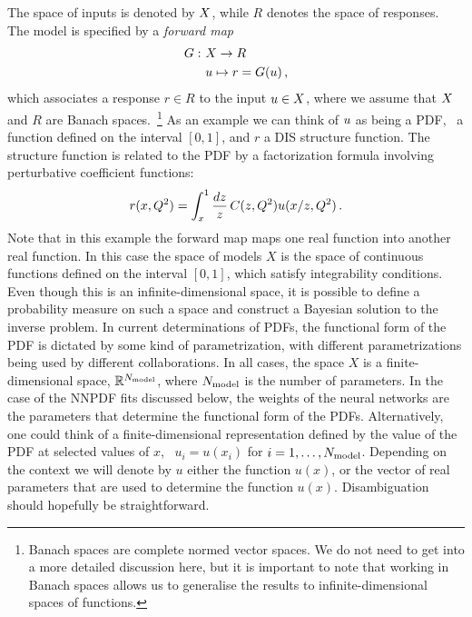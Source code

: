 The space of inputs is denoted by $X$, while $R$ denotes the space of
responses. The model is specified by a {\em forward map}
\begin{align}
  \label{eq:ForwardMap}
  G : ~& X \to R \nonumber \\
      & u \mapsto r=G(u) \, ,
\end{align}
which associates a response $r \in R$ to the input $u \in X$,
where we assume that $X$ and $R$ are Banach spaces.~\footnote{Banach
spaces are complete normed vector spaces. We do not need to get into a more
detailed discussion here, but it is important to note that working in Banach
spaces allows us to generalise the results to infinite-dimensional spaces of
functions.} As an example we can think of $u$ as being a PDF, \ie\ a
function defined on the interval $[0,1]$, and $r$ a DIS structure function. The
structure function is related to the PDF by a factorization formula involving
perturbative coefficient functions: 
\begin{align}
  \label{eq:DISExample}
  r(x,Q^2) = \int_x^1 \frac{dz}{z}\, C(z,Q^2) u(x/z,Q^2)\, .
\end{align}
Note that in this example the forward map maps one real function into another
real function. In this case the space of models $X$ is the space of continuous
functions defined on the interval $[0,1]$, which satisfy integrability
conditions. Even though this is an infinite-dimensional space, it is possible to
define a probability measure on such a space and construct a Bayesian solution
to the inverse problem. In current determinations of PDFs, the functional form
of the PDF is dictated by some kind of parametrization, with different
parametrizations being used by different collaborations. In all cases, the space
$X$ is a finite-dimensional space, $\mathbb{R}^{N_{\rm model}}$, where $N_{\rm model}$ is
the number of parameters. In the case of the NNPDF fits discussed below, the
weights of the neural networks are the parameters that determine the functional
form of the PDFs. Alternatively, one could think of a finite-dimensional
representation defined by the value of the PDF at selected values of $x$, \ie\
$u_i=u(x_i)$ for $i=1,\ldots,N_{\rm model}$. Depending on the context we will denote
by $u$ either the function $u(x)$, or the vector of real parameters that are
used to determine the function $u(x)$. Disambiguation should hopefully be
straightforward. 


